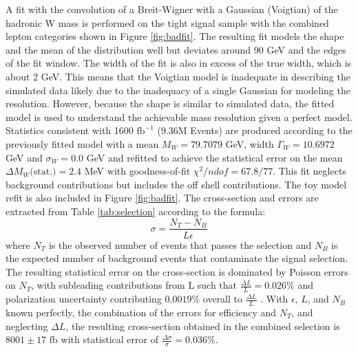 A fit with the convolution of a Breit-Wigner with a Gaussian (Voigtian) of the hadronic W mass is performed on the tight signal sample with the combined lepton categories shown in Figure \ref{fig:badfit}. The resulting fit models the shape and the mean of the distribution well but deviates around 90 GeV and the edges of the fit window. The width of the fit is also in excess of the true width, which is about 2 GeV. This means that the Voigtian model is inadequate in describing the simulated data likely due to the inadequacy of a single Gaussian for modeling the resolution. However, because the shape is similar to simulated data, the fitted model is used to understand the achievable mass resolution given a perfect model. Statistics consistent with 1600 $\text{fb}^{-1}$ (9.36M Events) are produced according to the previously fitted model with a mean  $M_W = 79.7079$ GeV, width $\Gamma_W = 10.6972$ GeV and $\sigma_W = 0.0$ GeV and refitted to achieve the statistical error on the mean $\Delta M_W \text{(stat.)} = 2.4$ MeV with goodness-of-fit $\chi^2 / ndof = 67.8/77$. This fit neglects background contributions but includes the off shell contributions. The toy model refit is also included in Figure \ref{fig:badfit}.
The cross-section and errors are extracted from Table \ref{tab:selection} according to the formula:
\begin{equation}
\sigma = \frac{N_T - N_B}{L \epsilon}
\end{equation}
where $N_T$ is the observed number of events that passes the selection and $N_B$ is the expected number of background events that contaminate the signal selection. The resulting statistical error on the cross-section is dominated by  Poisson errors on $N_T$, with subleading contributions from L such that $\frac{\Delta L}{L} = 0.026 \%$ and polarization uncertainty contributing $0.0019\%$ overall to $\frac{\Delta L}{L}$ \cite{ilcluminosity}. With $\epsilon$, $L$, and $N_B$ known perfectly, the combination of the errors for efficiency and $N_T$, and neglecting $\Delta L$, the resulting cross-section obtained in the combined selection is $8001 \pm 17 \, \, \text{fb}$ with statistical error of $\frac{\Delta \sigma}{\sigma} = 0.036 \%$. 
